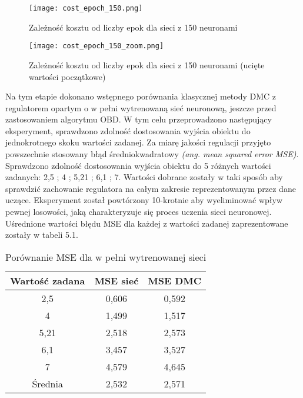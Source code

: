 \begin{figure}[!h]
  \label{fig:Koszt-liczba-epok}
  \centering \texttt{[image: cost\_epoch\_150.png]}
  \caption{Zależność kosztu od liczby epok dla sieci z 150 neuronami}
\end{figure}

\begin{figure}[!h]
  \label{fig:Koszt-liczba-epok-zoom}
  \centering \texttt{[image: cost\_epoch\_150\_zoom.png]}
  \caption{Zależność kosztu od liczby epok dla sieci z 150 neuronami (ucięte wartości początkowe)}
\end{figure}

\par Na tym etapie dokonano wstępnego porównania klasycznej metody DMC z regulatorem opartym o w pełni wytrenowaną sieć neuronową, jeszcze przed zastosowaniem algorytmu OBD. W tym celu przeprowadzono następujący eksperyment, sprawdzono zdolność dostosowania wyjścia obiektu do jednokrotnego skoku wartości zadanej. Za miarę jakości regulacji przyjęto powszechnie stosowany błąd średniokwadratowy \emph{(ang. mean squared error MSE)}. Sprawdzono zdolność dostosowania wyjścia obiektu do 5 różnych wartości zadanych: 2,5 ; 4 ; 5,21 ; 6,1 ; 7. Wartości dobrane zostały w taki sposób aby sprawdzić zachowanie regulatora na całym zakresie reprezentowanym przez dane uczące. Eksperyment został powtórzony 10-krotnie aby wyeliminować wpływ pewnej losowości, jaką charakteryzuje się proces uczenia sieci neuronowej. Uśrednione wartości błędu MSE dla każdej z wartości zadanej zaprezentowane zostały w tabeli 5.1.
\begin{table}[!h] \label{tab:tabela1} \centering
\caption{Porównanie MSE dla w pełni wytrenowanej sieci}
\begin{tabular} {| c | c | c |} \hline
    Wartość zadana & MSE sieć & MSE DMC \\ \hline\hline
    2,5 & 0,606 & 0,592 \\ \hline
    4 & 1,499 & 1,517 \\ \hline
    5,21 & 2,518 & 2,573 \\ \hline
    6,1 & 3,457 & 3,527 \\ \hline
    7 & 4,579 & 4,645 \\ \hline
    Średnia & 2,532 & 2,571 \\ \hline
    
\end{tabular}
\end{table}
